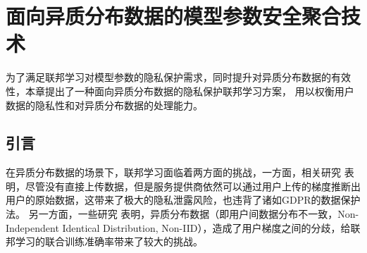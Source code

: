 \chapter{面向异质分布数据的模型参数安全聚合技术}\label{ppfl+hc}
为了满足联邦学习对模型参数的隐私保护需求，同时提升对异质分布数据的有效性，本章提出了一种面向异质分布数据的隐私保护联邦学习方案，
用以权衡用户数据的隐私性和对异质分布数据的处理能力。

\section{引言}

在异质分布数据的场景下，联邦学习面临着两方面的挑战，一方面，相关研究 \cite{geiping2020inverting,zhu2019deep,gao2021privacy} 表明，尽管没有直接上传数据，但是服务提供商依然可以通过用户上传的梯度推断出用户的原始数据，这带来了极大的隐私泄露风险，也违背了诸如GDPR\cite{voigt2017eu}的数据保护法。
另一方面，一些研究 \cite{zhao2018federated, tuor2021overcoming, yoshida2019hybrid}表明，异质分布数据（即用户间数据分布不一致，Non-Independent Identical Distribution, Non-IID），造成了用户梯度之间的分歧，给联邦学习的联合训练准确率带来了较大的挑战。

